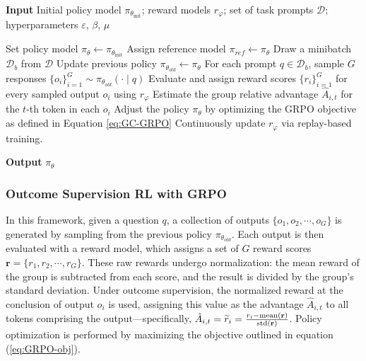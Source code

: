 \begin{itemize}[topsep=0pt]
\begin{itemize}[topsep=0pt]
\begin{algorithm}[t]
  \small
  \caption{Iterative Group Relative Policy Optimization}
  \textbf{Input} Initial policy model $\pi_{\theta_{\text{init}}}$; reward models $r_\varphi$; set of task prompts $\mathcal{D}$; 
  hyperparameters $\varepsilon$, $\beta$, $\mu$
  \begin{algorithmic}[1]
    \State Set policy model $\pi_\theta \gets \pi_{\theta_{\text{init}}}$
       \State Assign reference model $\pi_{ref} \gets \pi_{\theta}$
      \State Draw a minibatch $\mathcal{D}_b$ from $\mathcal{D}$
      \State Update previous policy $\pi_{\theta_{old}} \gets \pi_{\theta}$ 
      \State For each prompt $q \in \mathcal{D}_b$, sample $G$ responses $\{o_i\}_{i=1}^G \sim \pi_{\theta_{old}} (\cdot \mid q)$
      \State Evaluate and assign reward scores $\{r_i\}_{i=1}^{G}$ for every sampled output $o_i$ using $r_{\varphi}$ 
      \State Estimate the group relative advantage $\hat{A}_{i,t}$ for the $t$-th token in each $o_i$
        \State Adjust the policy $\pi_{\theta}$ by optimizing the GRPO objective as defined in Equation \ref{eq:GC-GRPO}
      \EndFor
    \EndFor 
    \State Continuously update $r_\varphi$ via replay-based training.
    \EndFor 
  \end{algorithmic}
  \textbf{Output} $\pi_\theta$
  \label{alg:iter-grpo}
\end{algorithm}

\subsubsection{Outcome Supervision RL with GRPO} In this framework, given a question $q$, a collection of outputs $\{o_1, o_2, \cdots, o_G\}$ is generated by sampling from the previous policy $\pi_{\theta_{old}}$. Each output is then evaluated with a reward model, which assigns a set of $G$ reward scores $\mathbf{r}=\{r_1, r_2, \cdots, r_G\}$. These raw rewards undergo normalization: the mean reward of the group is subtracted from each score, and the result is divided by the group's standard deviation. Under outcome supervision, the normalized reward at the conclusion of output $o_i$ is used, assigning this value as the advantage $\hat{A}_{i, t}$ to all tokens comprising the output—specifically, $\hat{A}_{i, t} = \widetilde{r}_i = \frac{r_i- {\rm mean}(\mathbf{r})}{{\rm std}(\mathbf{r})}$. Policy optimization is performed by maximizing the objective outlined in equation (\ref{eq:GRPO-obj}).


\end{itemize}
\end{itemize}
